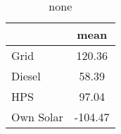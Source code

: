 \begin{table}[htbp]\centering
\def\sym#1{\ifmmode^{#1}\else\(^{#1}\)\fi}
\caption{none}
\begin{tabular}{l*{1}{c}}
\toprule
                    &        mean\\
\midrule
Grid                &      120.36\\
Diesel              &       58.39\\
HPS                 &       97.04\\
Own Solar           &     -104.47\\
\bottomrule
\end{tabular}
\end{table}
